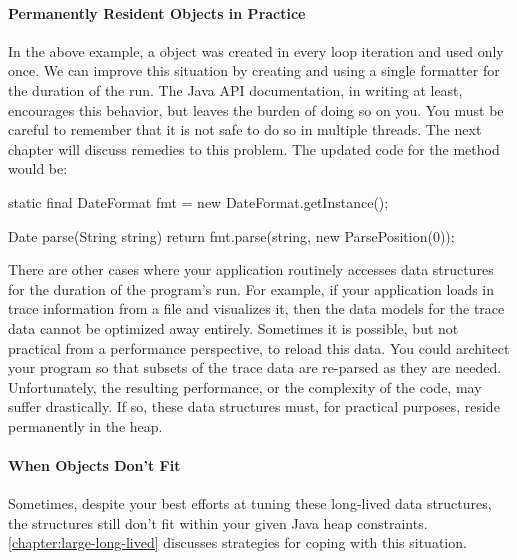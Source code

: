 \paragraph{Permanently Resident Objects in Practice}

In the above example, a  object was created in every loop
iteration and used only once. We can improve this situation by creating and using
a single formatter for the duration of the run. The Java API documentation, in
writing at least, encourages this behavior, but leaves the burden of doing so on
you. You must be careful to remember that it is not safe to do so in multiple
threads. The next chapter will discuss remedies to this problem. The updated code
for the  method would be:

\begin{shortlisting}
static final DateFormat fmt = new DateFormat.getInstance();

Date parse(String string) {
	return fmt.parse(string, new ParsePosition(0));
}
\end{shortlisting} 

There are other cases where your application routinely accesses data structures
for the duration of the program's run. For example, if your application loads in
trace information from a file and visualizes it, then the data models for the
trace data cannot be optimized away entirely. Sometimes it is possible, but not
practical from a performance perspective, to reload this data. You could
architect your program so that subsets of the trace data are re-parsed as they
are needed. Unfortunately, the resulting performance, or the complexity of the
code, may suffer drastically. If so, these data structures must, for practical
purposes, reside permanently in the heap.

\paragraph{When Objects Don't Fit}
Sometimes, despite your best efforts at tuning these long-lived data structures,
the structures still don't fit within your given Java heap constraints.
\autoref{chapter:large-long-lived} discusses strategies for coping with this
situation.


